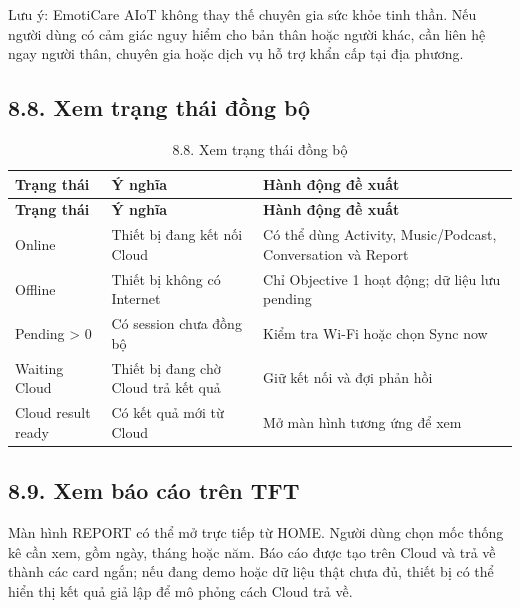 \documentclass[12pt,a4paper]{article}
\begin{document}
Lưu ý: EmotiCare AIoT không thay thế chuyên gia sức khỏe tinh thần. Nếu người dùng có cảm giác nguy hiểm cho bản thân hoặc người khác, cần liên hệ ngay người thân, chuyên gia hoặc dịch vụ hỗ trợ khẩn cấp tại địa phương.


\subsection*{8.8. Xem trạng thái đồng bộ}

\begin{center}
\begin{longtable}{|P{0.25\textwidth}|P{0.32\textwidth}|P{0.33\textwidth}|}
\caption{8.8. Xem trạng thái đồng bộ}\\
\hline
\textbf{Trạng thái} & \textbf{Ý nghĩa} & \textbf{Hành động đề xuất} \\
\hline
\endfirsthead
\hline
\textbf{Trạng thái} & \textbf{Ý nghĩa} & \textbf{Hành động đề xuất} \\
\hline
\endhead
Online & Thiết bị đang kết nối Cloud & Có thể dùng Activity, Music/Podcast, Conversation và Report \\
\hline
Offline & Thiết bị không có Internet & Chỉ Objective 1 hoạt động; dữ liệu lưu pending \\
\hline
Pending > 0 & Có session chưa đồng bộ & Kiểm tra Wi-Fi hoặc chọn Sync now \\
\hline
Waiting Cloud & Thiết bị đang chờ Cloud trả kết quả & Giữ kết nối và đợi phản hồi \\
\hline
Cloud result ready & Có kết quả mới từ Cloud & Mở màn hình tương ứng để xem \\
\hline
\end{longtable}
\end{center}

\subsection*{8.9. Xem báo cáo trên TFT}

Màn hình REPORT có thể mở trực tiếp từ HOME. Người dùng chọn mốc thống kê cần xem, gồm ngày, tháng hoặc năm. Báo cáo được tạo trên Cloud và trả về thành các card ngắn; nếu đang demo hoặc dữ liệu thật chưa đủ, thiết bị có thể hiển thị kết quả giả lập để mô phỏng cách Cloud trả về.
\end{document}
